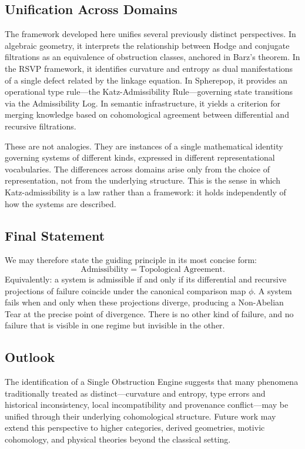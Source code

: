 \documentclass[12pt]{article}
\begin{document}
\subsection{Unification Across Domains}

The framework developed here unifies several previously distinct perspectives. In
algebraic geometry, it interprets the relationship between Hodge and conjugate
filtrations as an equivalence of obstruction classes, anchored in Barz's theorem. In
the RSVP framework, it identifies curvature and entropy as dual manifestations of a
single defect related by the linkage equation. In Spherepop, it provides an
operational type rule---the Katz-Admissibility Rule---governing state transitions via
the Admissibility Log. In semantic infrastructure, it yields a criterion for merging
knowledge based on cohomological agreement between differential and recursive
filtrations.

These are not analogies. They are instances of a single mathematical identity
governing systems of different kinds, expressed in different representational
vocabularies. The differences across domains arise only from the choice of
representation, not from the underlying structure. This is the sense in which
Katz-admissibility is a law rather than a framework: it holds independently of
how the systems are described.

\subsection{Final Statement}

We may therefore state the guiding principle in its most concise form:
\[
\text{Admissibility} = \text{Topological Agreement}.
\]
Equivalently: a system is admissible if and only if its differential and recursive
projections of failure coincide under the canonical comparison map $\phi$. A system
fails when and only when these projections diverge, producing a Non-Abelian Tear at
the precise point of divergence. There is no other kind of failure, and no failure that
is visible in one regime but invisible in the other.

\subsection{Outlook}

The identification of a Single Obstruction Engine suggests that many phenomena
traditionally treated as distinct---curvature and entropy, type errors and historical
inconsistency, local incompatibility and provenance conflict---may be unified through
their underlying cohomological structure. Future work may extend this perspective to
higher categories, derived geometries, motivic cohomology, and physical theories beyond
the classical setting.
\end{document}
